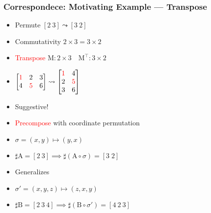 \documentclass[xetex,mathserif,serif]{beamer}
\newcommand\mrm[1]{\mathrm{#1}}
\newcommand\brm[1]{\bm{\mrm{#1}}}
\newcommand\NB[1]{\textcolor{red}{#1}}
\begin{document}
\begin{frame}
  \frametitle{Correspondece: Motivating Example --- Transpose}
  \pause
  \begin{itemize}[<+->]
    \item Permute \([2\ 3] \leadsto [3\ 2]\)
    \item Commutativity \(2\times3 = 3\times2\)
    \item \NB{Transpose} \(\brm M : 2\times3\quad \brm M^\intercal : 3\times2\)
    \item \(
      \begin{bmatrix}
        \NB 1 & 2 & 3 \\
        4 & \NB 5 & 6
      \end{bmatrix} \leadsto
      \begin{bmatrix}
        \NB 1 & 4 \\
        2 & \NB 5 \\
        3 & 6
      \end{bmatrix}
      \)
    \item Suggestive!
    \item \NB{Precompose} with coordinate permutation
    \item \(\sigma = (x, y) \mapsto (y, x)\)
    \item \(\sharp \brm A = [2\ 3] \implies \sharp(\brm A \circ \sigma) = [3\;2]\) 
    \item Generalizes
    \item \(\sigma' = (x, y, z) \mapsto (z, x, y)\)
    \item \(\sharp \brm B = [2\ 3\ 4] \implies \sharp(\brm B \circ \sigma') = [4\ 2\ 3]\) 
  \end{itemize}
\end{frame}
\end{document}
